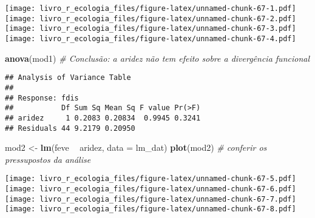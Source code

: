 \documentclass[
]{book}
\newenvironment{Shaded}{\begin{snugshade}}{\end{snugshade}}
\newcommand{\CommentTok}[1]{\textcolor[rgb]{0.56,0.35,0.01}{\textit{#1}}}
\newcommand{\DataTypeTok}[1]{\textcolor[rgb]{0.13,0.29,0.53}{#1}}
\newcommand{\KeywordTok}[1]{\textcolor[rgb]{0.13,0.29,0.53}{\textbf{#1}}}
\newcommand{\NormalTok}[1]{#1}
\newcommand{\OperatorTok}[1]{\textcolor[rgb]{0.81,0.36,0.00}{\textbf{#1}}}
\newcommand{\StringTok}[1]{\textcolor[rgb]{0.31,0.60,0.02}{#1}}
\begin{document}
\begin{Shaded}
\end{Shaded}

\texttt{[image: livro\_r\_ecologia\_files/figure-latex/unnamed-chunk-67-1.pdf]} \texttt{[image: livro\_r\_ecologia\_files/figure-latex/unnamed-chunk-67-2.pdf]} \texttt{[image: livro\_r\_ecologia\_files/figure-latex/unnamed-chunk-67-3.pdf]} \texttt{[image: livro\_r\_ecologia\_files/figure-latex/unnamed-chunk-67-4.pdf]}

\begin{Shaded}
\begin{Highlighting}[]
\KeywordTok{anova}\NormalTok{(mod1) }\CommentTok{# Conclusão: a aridez não tem efeito sobre a divergência funcional}
\end{Highlighting}
\end{Shaded}

\begin{verbatim}
## Analysis of Variance Table
## 
## Response: fdis
##           Df Sum Sq Mean Sq F value Pr(>F)
## aridez     1 0.2083 0.20834  0.9945 0.3241
## Residuals 44 9.2179 0.20950
\end{verbatim}

\begin{Shaded}
\begin{Highlighting}[]
\NormalTok{mod2 <-}\StringTok{ }\KeywordTok{lm}\NormalTok{(feve }\OperatorTok{~}\StringTok{ }\NormalTok{aridez, }\DataTypeTok{data =}\NormalTok{ lm_dat)}
\KeywordTok{plot}\NormalTok{(mod2) }\CommentTok{# conferir os pressupostos da análise}
\end{Highlighting}
\end{Shaded}

\texttt{[image: livro\_r\_ecologia\_files/figure-latex/unnamed-chunk-67-5.pdf]} \texttt{[image: livro\_r\_ecologia\_files/figure-latex/unnamed-chunk-67-6.pdf]} \texttt{[image: livro\_r\_ecologia\_files/figure-latex/unnamed-chunk-67-7.pdf]} \texttt{[image: livro\_r\_ecologia\_files/figure-latex/unnamed-chunk-67-8.pdf]}
\end{document}
